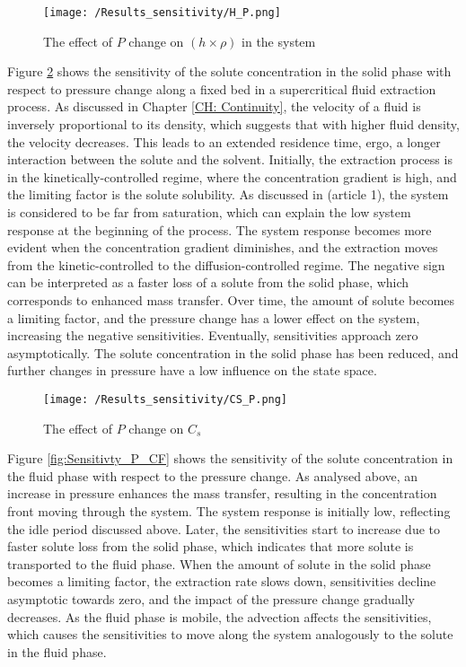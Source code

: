 \documentclass[../Article_Sensitivity_Analsysis.tex]{subfiles}
\begin{document}
	\begin{figure}[h!]
		\centering
		\texttt{[image: /Results\_sensitivity/H\_P.png]}
		\caption{The effect of $P$ change on $(h \times \rho)$ in the system}
		\label{fig:Sensitivty_P_H}
	\end{figure}
	
	Figure \ref{fig:Sensitivty_P_CS} shows the sensitivity of the solute concentration in the solid phase with respect to pressure change along a fixed bed in a supercritical fluid extraction process. As discussed in Chapter \ref{CH: Continuity}, the velocity of a fluid is inversely proportional to its density, which suggests that with higher fluid density, the velocity decreases. This leads to an extended residence time, ergo, a longer interaction between the solute and the solvent. Initially, the extraction process is in the kinetically-controlled regime, where the concentration gradient is high, and the limiting factor is the solute solubility. As discussed in ({\color{red}article 1}), the system is considered to be far from saturation, which can explain the low system response at the beginning of the process. The system response becomes more evident when the concentration gradient diminishes, and the extraction moves from the kinetic-controlled to the diffusion-controlled regime. The negative sign can be interpreted as a faster loss of a solute from the solid phase, which corresponds to enhanced mass transfer. Over time, the amount of solute becomes a limiting factor, and the pressure change has a lower effect on the system, increasing the negative sensitivities. Eventually, sensitivities approach zero asymptotically. The solute concentration in the solid phase has been reduced, and further changes in pressure have a low influence on the state space.

	\begin{figure}[h!]
		\centering
		\texttt{[image: /Results\_sensitivity/CS\_P.png]}
		\caption{The effect of $P$ change on $C_s$}
		\label{fig:Sensitivty_P_CS}
	\end{figure}
	
	Figure \ref{fig:Sensitivty_P_CF} shows the sensitivity of the solute concentration in the fluid phase with respect to the pressure change. As analysed above, an increase in pressure enhances the mass transfer, resulting in the concentration front moving through the system. The system response is initially low, reflecting the idle period discussed above. Later, the sensitivities start to increase due to faster solute loss from the solid phase, which indicates that more solute is transported to the fluid phase. When the amount of solute in the solid phase becomes a limiting factor, the extraction rate slows down, sensitivities decline asymptotic towards zero, and the impact of the pressure change gradually decreases. As the fluid phase is mobile, the advection affects the sensitivities, which causes the sensitivities to move along the system analogously to the solute in the fluid phase.
	
\end{document}
